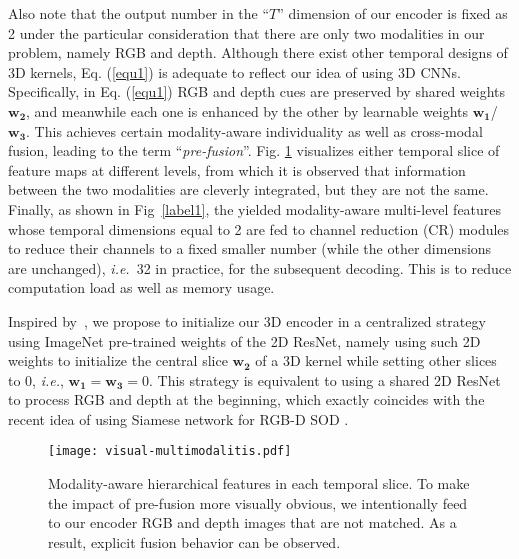 \documentclass[letterpaper]{article}
\def\ie{\emph{i.e.}}
\begin{document}
Also note that the output number in the ``$T$'' dimension of our encoder is fixed as 2 under the particular consideration that there are only two modalities in our problem, namely RGB and depth. Although there exist other temporal designs of 3D kernels, Eq. (\ref{equ1}) is adequate to reflect our idea of using 3D CNNs. Specifically, in Eq. (\ref{equ1}) RGB and depth cues are preserved by shared weights $\mathbf{w_2}$, and meanwhile each one is enhanced by the other by learnable weights $\mathbf{w_1}$/$\mathbf{w_3}$. This achieves certain modality-aware individuality as well as cross-modal fusion, leading to the term ``\emph{pre-fusion}''. Fig. \ref{label3} visualizes either temporal slice of feature maps at different levels, from which it is observed that information between the two modalities are cleverly integrated, but they are not the same. Finally, as shown in Fig~\ref{label1}, the yielded modality-aware multi-level features whose temporal dimensions equal to 2 are fed to channel reduction (CR) modules to reduce their channels to a fixed smaller number (while the other dimensions are unchanged), \ie~32 in practice, for the subsequent decoding. This is to reduce computation load as well as memory usage.

Inspired by~\cite{carreira2017quo,feichtenhofer2016spatiotemporal,girdhar2018detect}, we propose to initialize our 3D encoder in a centralized strategy using ImageNet pre-trained weights of the 2D ResNet, namely using such 2D weights to initialize the central slice $\mathbf{w_2}$ of a 3D kernel while setting other slices to 0, \ie, $\mathbf{w_1}=\mathbf{w_3}=0$. This strategy is equivalent to using a shared 2D ResNet to process RGB and depth at the beginning, which exactly coincides with the recent idea of using Siamese network for RGB-D SOD \cite{fu2020jl}.






\begin{figure}
	\centering
	\texttt{[image: visual-multimodalitis.pdf]}\vspace{-0.3cm}
	\caption{\small Modality-aware hierarchical features in each temporal slice. To make the impact of pre-fusion more visually obvious, we intentionally feed to our encoder RGB and depth images that are not matched. As a result, explicit fusion behavior can be observed.}\vspace{-0.3cm}
	\label{label3}
\end{figure}
\end{document}
